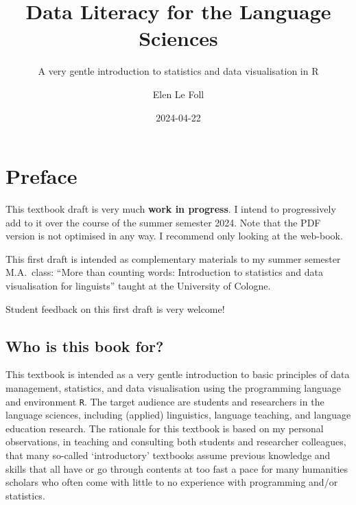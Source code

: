 \documentclass[
  letterpaper,
  DIV=11,
  numbers=noendperiod,
  oneside]{scrreprt}
\title{Data Literacy for the Language Sciences}
\subtitle{A very gentle introduction to statistics and data
visualisation in R}
\author{Elen Le Foll}
\date{2024-04-22}
\renewcommand*\contentsname{Table of contents}
\newcommand\contentsname{Table of contents}
\begin{document}
\maketitle

\renewcommand*\contentsname{Table of contents}
{
\hypersetup{linkcolor=}
\setcounter{tocdepth}{2}
\tableofcontents
}

\chapter*{Preface}\label{preface}


\begin{tcolorbox}[enhanced jigsaw, opacitybacktitle=0.6, colframe=quarto-callout-warning-color-frame, title=\textcolor{quarto-callout-warning-color}{\faExclamationTriangle}\hspace{0.5em}{Warning}, left=2mm, arc=.35mm, titlerule=0mm, breakable, leftrule=.75mm, colback=white, coltitle=black, toprule=.15mm, colbacktitle=quarto-callout-warning-color!10!white, bottomrule=.15mm, bottomtitle=1mm, toptitle=1mm, rightrule=.15mm, opacityback=0]

This textbook draft is very much \textbf{work in progress}. I intend to
progressively add to it over the course of the summer semester 2024.
Note that the PDF version is not optimised in any way. I recommend only
looking at the web-book.

This first draft is intended as complementary materials to my summer
semester M.A.~class: ``More than counting words: Introduction to
statistics and data visualisation for linguists'' taught at the
University of Cologne.

Student feedback on this first draft is very welcome!

\end{tcolorbox}

\section*{Who is this book for?}\label{who-is-this-book-for}


This textbook is intended as a very gentle introduction to basic
principles of data management, statistics, and data visualisation using
the programming language and environment \texttt{R}. The target audience
are students and researchers in the language sciences, including
(applied) linguistics, language teaching, and language education
research. The rationale for this textbook is based on my personal
observations, in teaching and consulting both students and researcher
colleagues, that many so-called `introductory' textbooks assume previous
knowledge and skills that all have or go through contents at too fast a
pace for many humanities scholars who often come with little to no
experience with programming and/or statistics.
\end{document}
